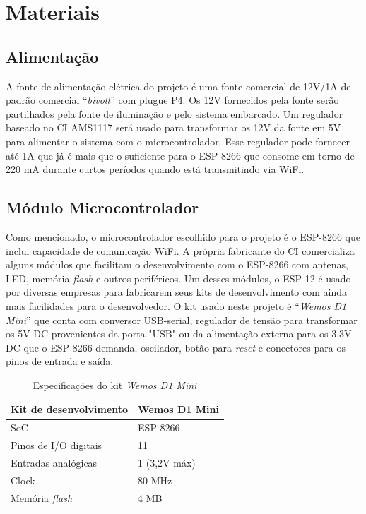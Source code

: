 \section{Materiais}

\subsection{Alimentação}

A fonte de alimentação elétrica do projeto é uma fonte comercial de 12V/1A de padrão comercial “\textit{bivolt}” com plugue P4. Os 12V fornecidos pela fonte serão partilhados pela fonte de iluminação e pelo sistema embarcado. Um regulador baseado no CI AMS1117 será usado para transformar os 12V da fonte em 5V para alimentar o sistema com o microcontrolador. Esse regulador pode fornecer até 1A que já é mais que o suficiente para o ESP-8266 que consome em torno de 220 mA durante curtos períodos quando está transmitindo via WiFi.

\subsection{Módulo Microcontrolador}

Como mencionado, o microcontrolador escolhido para o projeto é o ESP-8266 que inclui capacidade de comunicação WiFi. A própria fabricante do CI comercializa alguns módulos que facilitam o desenvolvimento com o ESP-8266 com antenas, LED, memória \textit{flash} e outros periféricos. Um desses módulos, o ESP-12 é usado por diversas empresas para fabricarem seus kits de desenvolvimento com ainda mais facilidades para o desenvolvedor. O kit usado neste projeto é “\textit{Wemos D1 Mini}” que conta com conversor USB-serial, regulador de tensão para transformar os 5V DC provenientes da porta "USB" ou da alimentação externa para os 3.3V DC que o ESP-8266 demanda, oscilador, botão para \textit{reset} e conectores para os pinos de entrada e saída.

\begin{table}
    \centering
    \label{wemos_dados}
    \caption{Especificações do kit \textit{Wemos D1 Mini}}
    \begin{tabular}{ll} 
        \hline
        Kit de desenvolvimento          & Wemos D1 Mini  \\ 
        \hline
        SoC                             & ESP-8266       \\ 
        \hline
        Pinos de I/O digitais           & 11             \\ 
        \hline
        Entradas analógicas             & 1 (3,2V máx)   \\ 
        \hline
        Clock                           & 80 MHz         \\ 
        \hline
        Memória \textit{flash}          & 4 MB           \\
        \hline
    \end{tabular}
\end{table}

